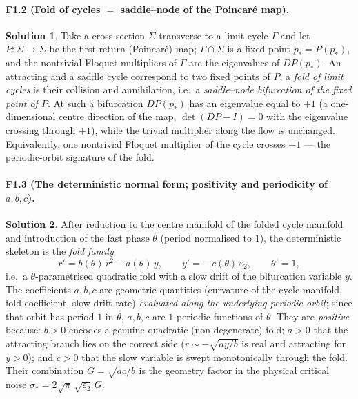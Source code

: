 \documentclass[11pt]{article}
\newcommand{\ep}{\varepsilon_2}
\theoremstyle{definition}
\newtheorem*{sol}{Solution}
\begin{document}
\paragraph{F1.2 (Fold of cycles $=$ saddle--node of the Poincar\'e map).}
\begin{sol}
Take a cross-section $\Sigma$ transverse to a limit cycle $\Gamma$ and let $P:\Sigma\to\Sigma$
be the first-return (Poincar\'e) map; $\Gamma\cap\Sigma$ is a fixed point $p_*=P(p_*)$, and the
nontrivial Floquet multipliers of $\Gamma$ are the eigenvalues of $DP(p_*)$. An attracting and a
saddle cycle correspond to two fixed points of $P$; a \emph{fold of limit cycles} is their
collision and annihilation, i.e.\ a \emph{saddle--node bifurcation of the fixed point of $P$}.
At such a bifurcation $DP(p_*)$ has an eigenvalue equal to $+1$ (a one-dimensional centre
direction of the map, $\det(DP-I)=0$ with the eigenvalue crossing through $+1$), while the
trivial multiplier along the flow is unchanged. Equivalently, one nontrivial Floquet multiplier
of the cycle crosses $+1$ --- the periodic-orbit signature of the fold.
\end{sol}

\paragraph{F1.3 (The deterministic normal form; positivity and periodicity of $a,b,c$).}
\begin{sol}
After reduction to the centre manifold of the folded cycle manifold and introduction of the fast
phase $\theta$ (period normalised to $1$), the deterministic skeleton is the \emph{fold family}
\[
r'=b(\theta)\,r^2-a(\theta)\,y,\qquad y'=-\,c(\theta)\,\ep,\qquad \theta'=1,
\]
i.e.\ a $\theta$-parametrised quadratic fold with a slow drift of the bifurcation variable $y$.
The coefficients $a,b,c$ are geometric quantities (curvature of the cycle manifold, fold
coefficient, slow-drift rate) \emph{evaluated along the underlying periodic orbit}; since that
orbit has period $1$ in $\theta$, $a,b,c$ are $1$-periodic functions of $\theta$. They are
\emph{positive} because: $b>0$ encodes a genuine quadratic (non-degenerate) fold; $a>0$ that the
attracting branch lies on the correct side ($r\sim-\sqrt{a y/b}$ is real and attracting for
$y>0$); and $c>0$ that the slow variable is swept monotonically through the fold. Their
combination $G=\sqrt{a c/b}$ is the geometry factor in the physical critical noise
$\sigma_*=2\sqrt{\pi}\,\sqrt{\ep}\,G$.
\end{sol}
\end{document}

